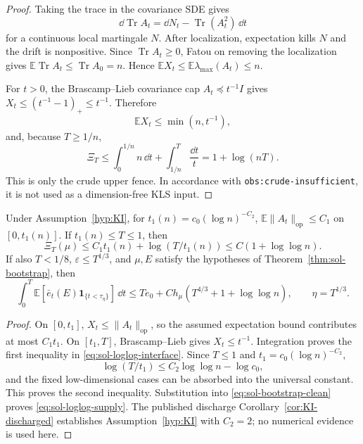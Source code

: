 \documentclass[../main.tex]{subfiles}
\begin{document}
\begin{proof}
Taking the trace in the covariance SDE gives
\[
  \dd\operatorname{Tr}A_t=\dd N_t-\operatorname{Tr}(A_t^2)\,\dd t
\]
for a continuous local martingale $N$.  After localization, expectation kills $N$ and the
drift is nonpositive.  Since $\operatorname{Tr}A_t\geq0$, Fatou on removing the localization
gives
$\mathbb E\operatorname{Tr}A_t\leq\operatorname{Tr}A_0=n$.  Hence
$\mathbb E X_t\leq\mathbb E\lambda_{\max}(A_t)\leq n$.

For $t>0$, the Brascamp--Lieb covariance cap $A_t\preceq t^{-1}I$ gives
$X_t\leq(t^{-1}-1)_+\leq t^{-1}$.  Therefore
\[
  \mathbb E X_t\leq\min(n,t^{-1}),
\]
and, because $T\geq1/n$,
\[
  \Xi_T\leq\int_0^{1/n}n\,\dd t+
             \int_{1/n}^T\frac{\dd t}{t}
  =1+\log(nT).
\]
This is only the crude upper fence.  In accordance with
\texttt{obs:crude-insufficient}, it is not used as a dimension-free KLS input.
\end{proof}

\begin{corollary}
\label{cor:sol-loglog}
Under Assumption~\ref{hyp:KI}, for
$t_1(n)=c_0(\log n)^{-C_2}$,
$\mathbb E\|A_t\|_{\mathrm{op}}\leq C_1$ on $[0,t_1(n)]$.  If
$t_1(n)\leq T\leq1$, then
\begin{equation}
  \Xi_T(\mu)\leq C_1t_1(n)+\log(T/t_1(n))
  \leq C(1+\log\log n).
  \label{eq:sol-loglog-interface}
\end{equation}
If also $T<1/8$, $\varepsilon\leq T^{1/3}$, and $\mu,E$ satisfy the hypotheses of
Theorem~\ref{thm:sol-bootstrap}, then
\begin{equation}
  \int_0^T\mathbb E[\bar e_t(E)\mathbf 1_{\{t<\tau_\eta\}}]\,\dd t
  \leq Te_0+C h_\mu(T^{4/3}+1+\log\log n),
  \qquad \eta=T^{1/3}.
  \label{eq:sol-loglog-supply}
\end{equation}
\end{corollary}

\begin{proof}
On $[0,t_1]$, $X_t\leq\|A_t\|_{\mathrm{op}}$, so the assumed expectation bound contributes
at most $C_1t_1$.  On $[t_1,T]$, Brascamp--Lieb gives $X_t\leq t^{-1}$.  Integration proves
the first inequality in \eqref{eq:sol-loglog-interface}.  Since $T\leq1$ and
$t_1=c_0(\log n)^{-C_2}$,
\[
  \log(T/t_1)\leq C_2\log\log n-\log c_0,
\]
and the fixed low-dimensional cases can be absorbed into the universal constant.  This proves
the second inequality.  Substitution into \eqref{eq:sol-bootstrap-clean} proves
\eqref{eq:sol-loglog-supply}.  The published discharge
Corollary~\ref{cor:KI-discharged} establishes Assumption~\ref{hyp:KI} with $C_2=2$; no numerical
evidence is used here.
\end{proof}
\end{document}
